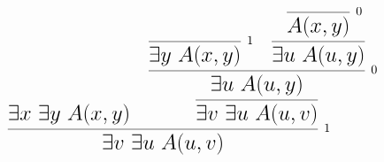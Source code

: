 \documentclass[14pt,border=2pt]{standalone}
\begin{document}
        $$
        \LARGE 

\begin{prooftree}
\hypo{\exists x~ \exists y~ A(x,y)}
\infer0[\normalsize 1]{\exists y~ A(x,y)}
\infer0[\normalsize 0]{A(x,y)}
\infer1{\exists u~ A(u,y)}
\infer2[\normalsize 0]{\exists u~ A(u,y)}
\infer1{\exists v~ \exists u~ A(u,v)}
\infer2[\normalsize 1]{\exists v~ \exists u~ A(u,v)}
\end{prooftree}
        $$
        
\end{document}
